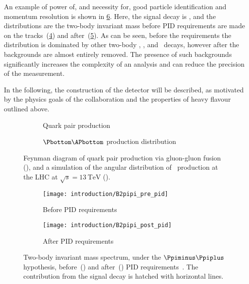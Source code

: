 An example of power of, and necessity for, good particle identification and 
momentum resolution is shown in \cref{fig:intro:lhcb:pid_power}.
Here, the signal decay is \decay{\PBzero}{\pimpip}, and the distributions are 
the two-body invariant mass before \ac{PID} requirements are made on the 
tracks~(\ref{fig:intro:lhcb:pid_power:pre}) and 
after~(\ref{fig:intro:lhcb:pid_power:post}).
As can be seen, before the requirements the distribution is dominated by other 
two-body \PBzero, \PBs, and \PLambdab\ decays, however after the backgrounds 
are almost entirely removed.
The presence of such backgrounds significantly increases the complexity of an 
analysis and can reduce the precision of the measurement.

In the following, the construction of the detector will be described, as 
motivated by the physics goals of the collaboration and the properties of heavy 
flavour outlined above.

\begin{figure}
  \begin{subfigure}[b]{0.4\textwidth}
    \centering
    
    \caption{Quark pair production}
    \label{fig:intro:lhcb:hf_production:gg_fusion}
  \end{subfigure}
  \begin{subfigure}[b]{0.6\textwidth}
    
    \caption{$\Pbottom\APbottom$ production distribution}
    \label{fig:intro:lhcb:hf_production:bbbar_angles}
  \end{subfigure}
  \caption{%
    Feynman diagram of quark pair production via gluon-gluon fusion 
    (), and a simulation of the 
    angular distribution of \bbbar\ production at the \ac{LHC} at $\sqrt{s} = 
    \SI{13}{\TeV}$ ().
  }
  \label{fig:intro:lhcb:hf_production}
\end{figure}

\begin{figure}
  \begin{subfigure}[b]{0.5\textwidth}
    \centering
    \texttt{[image: introduction/B2pipi\_pre\_pid]}
    \caption{Before \ac{PID} requirements}
    \label{fig:intro:lhcb:pid_power:pre}
  \end{subfigure}
  \begin{subfigure}[b]{0.5\textwidth}
    \centering
    \texttt{[image: introduction/B2pipi\_post\_pid]}
    \caption{After \ac{PID} requirements}
    \label{fig:intro:lhcb:pid_power:post}
  \end{subfigure}
  \caption{%
    Two-body invariant mass spectrum, under the $\pimpip$ hypothesis, 
    before~() and 
    after~() \ac{PID} 
    requirements~\cite{Aaij:2012as}.
    The contribution from the signal decay is hatched with horizontal lines.
  }
  \label{fig:intro:lhcb:pid_power}
\end{figure}

